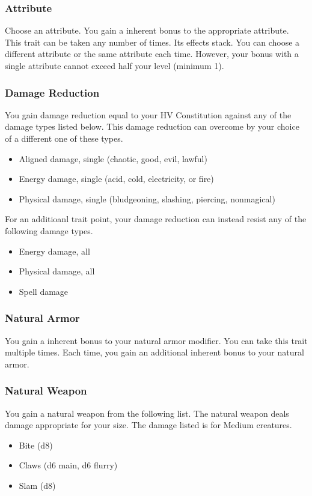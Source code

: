 \subsubsection{Attribute}
Choose an attribute.
\featben You gain a  inherent bonus to the appropriate attribute.
 This trait can be taken any number of times. Its effects stack. You can choose a different attribute or the same attribute each time. However, your bonus with a single attribute cannot exceed half your level (minimum 1).

\subsubsection{Damage Reduction}
\featben You gain damage reduction equal to your HV \add Constitution against any of the damage types listed below. This damage reduction can overcome by your choice of a different one of these types.
\begin{itemize}
    \item Aligned damage, single (chaotic, good, evil, lawful)
    \item Energy damage, single (acid, cold, electricity, or fire)
    \item Physical damage, single (bludgeoning, slashing, piercing, nonmagical)
\end{itemize}
 For an additioanl trait point, your damage reduction can instead resist any of the following damage types.
\begin{itemize}
    \item Energy damage, all
    \item Physical damage, all
    \item Spell damage
\end{itemize}

\subsubsection{Natural Armor}
\featben You gain a  inherent bonus to your natural armor modifier.
 You can take this trait multiple times. Each time, you gain an additional  inherent bonus to your natural armor.

\subsubsection{Natural Weapon}
\featben You gain a natural weapon from the following list. The natural weapon deals damage appropriate for your size. The damage listed is for Medium creatures.
\begin{itemize}
    \item Bite (d8)
    \item Claws (d6 main, d6 flurry)
    \item Slam (d8)
\end{itemize}

